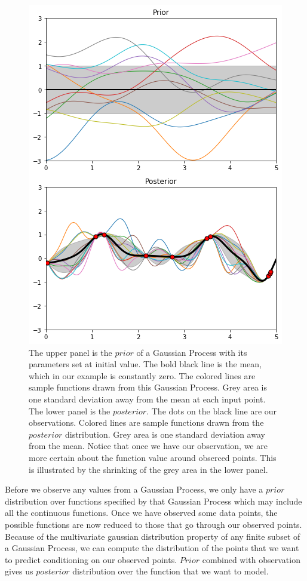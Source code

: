 \documentclass[11pt,a4paper]{article}
\theoremstyle{definition}
\numberwithin{equation}{section}
\begin{document}
	\begin{figure}[h!]
		\centering
		\includegraphics[width=0.6\linewidth]{gp.png}
		\caption{The upper panel is the $prior$ of a Gaussian Process with its parameters set at initial value. The bold black line is the mean, which in our example is constantly zero. The colored lines are sample functions drawn from this Gaussian Process. Grey area is one standard deviation away from the mean at each input point. The lower panel is the $posterior$. The dots on the black line are our observations. Colored lines are sample functions drawn from the $posterior$ distribution. Grey area is one standard deviation away from the mean. Notice that once we have our observation, we are more certain about the function value around obserced points. This is illustrated by the shrinking of the grey area in the lower panel.}
		\label{fig:gp}
	\end{figure}
	
	Before we observe any values from a Gaussian Process, we only have a $prior$ distribution over functions specified by that Gaussian Process which may include all the continuous functions. Once we have observed some data points, the possible functions are now reduced to those that go through our observed points. Because of the multivariate gaussian distribution property of any finite subset of a Gaussian Process, we can compute the distribution of the points that we want to predict conditioning on our observed points. $Prior$ combined with observation gives us $posterior$ distribution over the function that we want to model.
	
\end{document}
